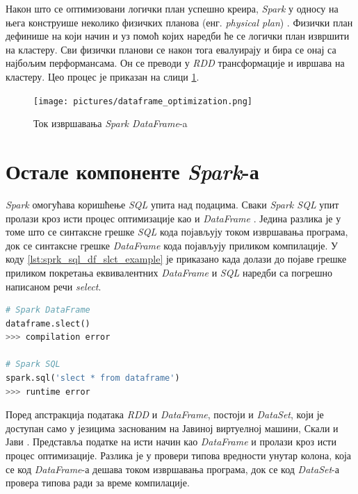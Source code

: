 \documentclass[12pt,oneside]{memoir}
\begin{document}
Након што се оптимизовани логички план успешно креира, \textit{Spark} у односу на њега конструише неколико физичких планова (енг. \textit{physical plan}) \cite{spark_guide}. Физички план дефинише на који начин и уз помоћ којих наредби ће се логички план извршити на кластеру. Сви физички планови се након тога евалуирају и бира се онај са најбољим перформансама. Он се преводи у \textit{RDD} трансформације и ивршава на кластеру. Цео процес је приказан на слици \ref{fig:sprk_ex_plns}.

\begin{figure}[!ht]
  \centering
  \texttt{[image: pictures/dataframe\_optimization.png]}
  \caption{Ток извршавања \textit{Spark DataFrame}-a}
  \label{fig:sprk_ex_plns}
\end{figure}

\section{Остале компоненте \textit{Spark}-а}
\label{sec:spark_components}

\textit{Spark} омогућава коришћење \textit{SQL} упита над подацима. Сваки \textit{Spark SQL} упит пролази кроз исти процес оптимизације као и \textit{DataFrame} \cite{spark_guide}. Једина разлика је у томе што се синтаксне грешке \textit{SQL} кода појављују током извршавања програма, док се синтаксне грешке \textit{DataFrame} кода појављују приликом компилације. У коду \ref{lst:sprk_sql_df_slct_example} је приказано када долази до појаве грешке приликом покретања еквивалентних \textit{DataFrame} и \textit{SQL} наредби са погрешно написаном речи \textit{select}.  

\begin{lstlisting}[language=Python, caption={Извршавање \textit{DataFrame} и  \textit{SQL} кодова са грешком у писању}, label={lst:sprk_sql_df_slct_example}]
# Spark DataFrame
dataframe.slect()
>>> compilation error

# Spark SQL
spark.sql('slect * from dataframe')
>>> runtime error
\end{lstlisting}

Поред апстракција података \textit{RDD} и \textit{DataFrame}, постоји и \textit{DataSet}, који је доступан само у језицима заснованим на Јавиној виртуелној машини, Скали и Јави \cite{spark_guide}. Представља податке на исти начин као \textit{DataFrame} и пролази кроз исти процес оптимизације. Разлика је у провери типова вредности унутар колона, која се код \textit{DataFrame}-а дешава током извршавања програма, док се код \textit{DataSet}-а провера типова ради за време компилације.
\end{document}
